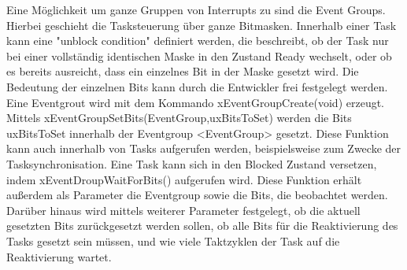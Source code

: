 Eine Möglichkeit um ganze Gruppen von Interrupts zu sind die Event Groups. Hierbei geschieht die Tasksteuerung über ganze Bitmasken. Innerhalb einer Task kann eine "unblock condition" definiert werden, die beschreibt, ob der Task nur bei einer vollständig identischen Maske in den Zustand Ready wechselt, oder ob es bereits ausreicht, dass ein einzelnes Bit in der Maske gesetzt wird. Die Bedeutung der einzelnen Bits kann durch die Entwickler frei festgelegt werden. Eine Eventgrout wird mit dem Kommando xEventGroupCreate(void) erzeugt. Mittels xEventGroupSetBits(EventGroup,uxBitsToSet) werden die Bits uxBitsToSet innerhalb der Eventgroup <EventGroup> gesetzt. Diese Funktion kann auch innerhalb von Tasks aufgerufen werden, beispielsweise zum Zwecke der Tasksynchronisation. Eine Task kann sich in den Blocked Zustand versetzen, indem xEventDroupWaitForBits() aufgerufen wird. Diese Funktion erhält außerdem als Parameter die Eventgroup sowie die Bits, die beobachtet werden. Darüber hinaus wird mittels weiterer Parameter festgelegt, ob die aktuell gesetzten Bits zurückgesetzt werden sollen, ob alle Bits für die Reaktivierung des Tasks gesetzt sein müssen, und wie viele Taktzyklen der Task auf die Reaktivierung wartet.
